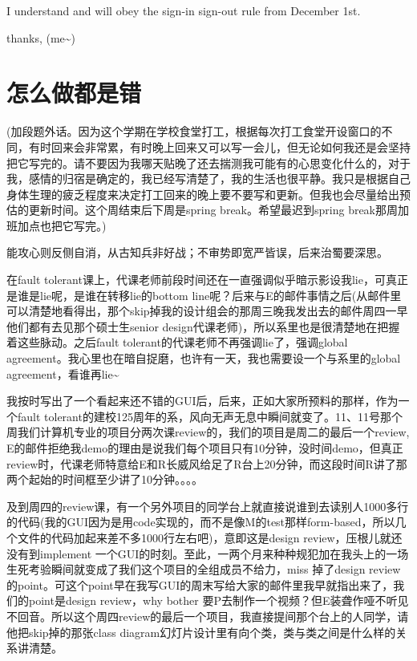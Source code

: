\documentclass[12pt]{book}
\begin{document}
I understand and will obey the sign-in sign-out rule from December 1st. 

thanks,
(me\textasciitilde{})

\chapter{怎么做都是错}
\label{sec-27}
(加段题外话。因为这个学期在学校食堂打工，根据每次打工食堂开设窗口的不同，有时回来会非常累，有时晚上回来又可以写一会儿，但无论如何我还是会坚持把它写完的。请不要因为我哪天贴晚了还去揣测我可能有的心思变化什么的，对于我，感情的归宿是确定的，我已经写清楚了，我的生活也很平静。我只是根据自己身体生理的疲乏程度来决定打工回来的晚上要不要写和更新。但我也会尽量给出预估的更新时间。这个周结束后下周是spring break。希望最迟到spring break那周加班加点也把它写完。)

能攻心则反侧自消，从古知兵非好战；不审势即宽严皆误，后来治蜀要深思。

在fault tolerant课上，代课老师前段时间还在一直强调似乎暗示影设我lie，可真正是谁是lie呢，是谁在转移lie的bottom line呢？后来与E的邮件事情之后(从邮件里可以清楚地看得出，那个skip掉我的设计组会的那周三晚我发出去的邮件周四一早他们都有去见那个硕士生senior design代课老师)，所以系里也是很清楚地在把握着这些脉动。之后fault tolerant的代课老师不再强调lie了，强调global agreement。我心里也在暗自捉磨，也许有一天，我也需要设一个与系里的global agreement，看谁再lie\textasciitilde{} 

我按时写出了一个看起来还不错的GUI后，后来，正如大家所预料的那样，作为一个fault tolerant的建校125周年的系，风向无声无息中瞬间就变了。11、11号那个周我们计算机专业的项目分两次课review的，我们的项目是周二的最后一个review, E的邮件拒绝我demo的理由是说我们每个项目只有10分钟，没时间demo，但真正review时，代课老师特意给E和R长威风给足了R台上20分钟，而这段时间R讲了那两个起始的时间框至少讲了10分钟。。。。

及到周四的review课，有一个另外项目的同学台上就直接说谁到去读别人1000多行的代码(我的GUI因为是用code实现的，而不是像M的test那样form-based，所以几个文件的代码加起来差不多1000行左右吧)，意即这是design review，压根儿就还没有到implement 一个GUI的时刻。至此，一两个月来种种规犯加在我头上的一场生死考验瞬间就变成了我们这个项目的全组成员不给力，miss 掉了design review的point。可这个point早在我写GUI的周末写给大家的邮件里我早就指出来了，我们的point是design review，why bother 要P去制作一个视频？但E装聋作哑不听见不回音。所以这个周四review的最后一个项目，我直接提间那个台上的人同学，请他把skip掉的那张class diagram幻灯片设计里有向个类，类与类之间是什么样的关系讲清楚。
\end{document}
